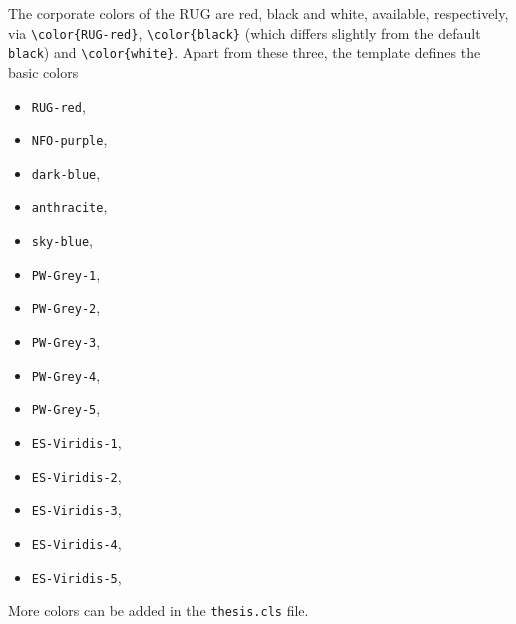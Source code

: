 The corporate colors of the RUG are red, black and white, available, respectively, via \texttt{\textbackslash color\{{\color{RUG-red}RUG-red}\}}, \texttt{\textbackslash color\{{\color{black}black}\}} (which differs slightly from the default \texttt{black}) and \texttt{\textbackslash color\{white\}}. Apart from these three, the template defines the basic colors
\begin{itemize}
\itemsep 0pt
\parskip 0pt
\item\texttt{\color{RUG-red}RUG-red},
\item\texttt{\color{NFO-purple}NFO-purple},
\item\texttt{\color{dark-blue}dark-blue},
\item\texttt{\color{anthracite}anthracite},
\item\texttt{\color{sky-blue}sky-blue},
\item\texttt{\color{PW-Grey-1}PW-Grey-1},
\item\texttt{\color{PW-Grey-2}PW-Grey-2},
\item\texttt{\color{PW-Grey-3}PW-Grey-3},
\item\texttt{\color{PW-Grey-4}PW-Grey-4},
\item\texttt{\color{PW-Grey-5}PW-Grey-5},
\item\texttt{\color{ES-Viridis-1}ES-Viridis-1},
\item\texttt{\color{ES-Viridis-2}ES-Viridis-2},
\item\texttt{\color{ES-Viridis-3}ES-Viridis-3},
\item\texttt{\color{ES-Viridis-4}ES-Viridis-4},
\item\texttt{\color{ES-Viridis-5}ES-Viridis-5},
\end{itemize}

More colors can be added in the \texttt{thesis.cls} file.

